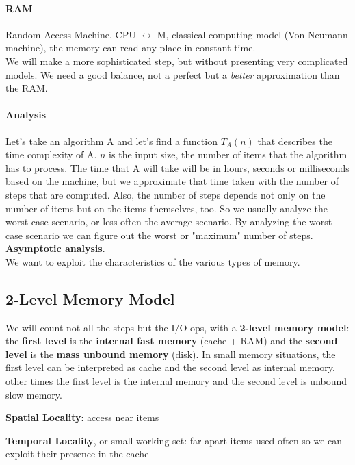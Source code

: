 \documentclass[10pt]{report}
\begin{document}
\paragraph{RAM} Random Access Machine, CPU $\leftrightarrow$ M, classical computing model (Von Neumann machine), the memory can read any place in constant time.\\
We will make a more sophisticated step, but without presenting very complicated models. We need a good balance, not a perfect but a \textit{better} approximation than the RAM.
\paragraph{Analysis} Let's take an algorithm A and let's find a function $T_A(n)$ that describes the time complexity of A. $n$ is the input size, the number of items that the algorithm has to process. The time that A will take will be in hours, seconds or milliseconds based on the machine, but we approximate that time taken with the number of steps that are computed. Also, the number of steps depends not only on the number of items but on the items themselves, too. So we usually analyze the worst case scenario, or less often the average scenario. By analyzing the worst case scenario we can figure out the worst or "maximum" number of steps. \textbf{Asymptotic analysis}.\\
We want to exploit the characteristics of the various types of memory.
\subsection{2-Level Memory Model}
We will count not all the steps but the I/O ops, with a \textbf{2-level memory model}: the \textbf{first level} is the \textbf{internal fast memory} (cache + RAM) and the \textbf{second level} is the \textbf{mass unbound memory} (disk). In small memory situations, the first level can be interpreted as cache and the second level as internal memory, other times the first level is the internal memory and the second level is unbound slow memory.
\begin{list}{}{}
	\item \textbf{Spatial Locality}: access near items
	\item \textbf{Temporal Locality}, or small working set: far apart items used often so we can exploit their presence in the cache
\end{list}
\end{document}

